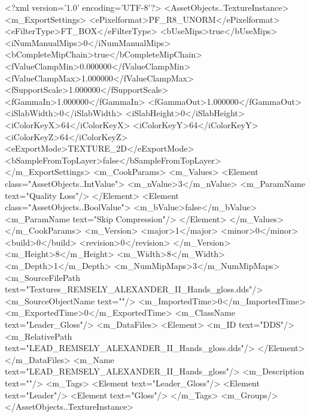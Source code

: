 <?xml version='1.0' encoding='UTF-8'?>
<AssetObjects..TextureInstance>
  <m_ExportSettings>
    <ePixelformat>PF_R8_UNORM</ePixelformat>
    <eFilterType>FT_BOX</eFilterType>
    <bUseMips>true</bUseMips>
    <iNumManualMips>0</iNumManualMips>
    <bCompleteMipChain>true</bCompleteMipChain>
    <fValueClampMin>0.000000</fValueClampMin>
    <fValueClampMax>1.000000</fValueClampMax>
    <fSupportScale>1.000000</fSupportScale>
    <fGammaIn>1.000000</fGammaIn>
    <fGammaOut>1.000000</fGammaOut>
    <iSlabWidth>0</iSlabWidth>
    <iSlabHeight>0</iSlabHeight>
    <iColorKeyX>64</iColorKeyX>
    <iColorKeyY>64</iColorKeyY>
    <iColorKeyZ>64</iColorKeyZ>
    <eExportMode>TEXTURE_2D</eExportMode>
    <bSampleFromTopLayer>false</bSampleFromTopLayer>
  </m_ExportSettings>
  <m_CookParams>
    <m_Values>
      <Element class="AssetObjects..IntValue">
        <m_nValue>3</m_nValue>
        <m_ParamName text="Quality Loss"/>
      </Element>
      <Element class="AssetObjects..BoolValue">
        <m_bValue>false</m_bValue>
        <m_ParamName text="Skip Compression"/>
      </Element>
    </m_Values>
  </m_CookParams>
  <m_Version>
    <major>1</major>
    <minor>0</minor>
    <build>0</build>
    <revision>0</revision>
  </m_Version>
  <m_Height>8</m_Height>
  <m_Width>8</m_Width>
  <m_Depth>1</m_Depth>
  <m_NumMipMaps>3</m_NumMipMaps>
  <m_SourceFilePath text="Textures\LEAD_REMSELY_ALEXANDER_II_Hands_gloss.dds"/>
  <m_SourceObjectName text=""/>
  <m_ImportedTime>0</m_ImportedTime>
  <m_ExportedTime>0</m_ExportedTime>
  <m_ClassName text="Leader_Gloss"/>
  <m_DataFiles>
    <Element>
      <m_ID text="DDS"/>
      <m_RelativePath text="LEAD_REMSELY_ALEXANDER_II_Hands_gloss.dds"/>
    </Element>
  </m_DataFiles>
  <m_Name text="LEAD_REMSELY_ALEXANDER_II_Hands_gloss"/>
  <m_Description text=""/>
  <m_Tags>
    <Element text="Leader_Gloss"/>
    <Element text="Leader"/>
    <Element text="Gloss"/>
  </m_Tags>
  <m_Groups/>
</AssetObjects..TextureInstance>

